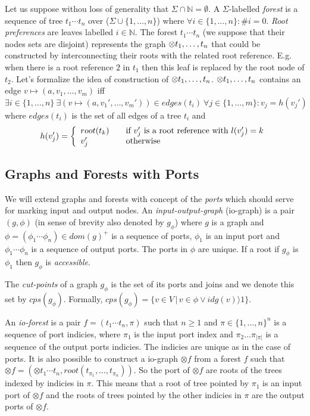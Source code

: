 Let us suppose withou loss of generality that $\Sigma \cap \mathbb{N} = \emptyset$.
A $\Sigma$-labelled \emph{forest} is a sequence of tree $t_1 \cdots t_n$ over ($\Sigma \cup \{1,\ldots,n\}$)
where $\forall i \in \{1,\ldots,n\}: \#i = 0$.
\emph{Root preferences} are leaves labelled $i \in \mathbb{N}$.
The forest $t_1 \cdots t_n$ (we suppose that their nodes sets are disjoint) represents the graph $\otimes t_1, \ldots, t_n$ that could
be constructed by interconnecting their roots with the related root reference.
E.g. when there is a root reference $2$ in $t_1$ then this leaf is replaced by the root node of $t_2$.
Let's formalize the idea of construction of $\otimes t_1, \ldots, t_n$.
$\otimes t_1, \ldots, t_n$ contains an edge $v \mapsto (a,v_1, \ldots,v_m)$ iff $\exists i \in \{1,\ldots,n\} \ \exists(v \mapsto (a, v_1', \ldots, v_m')) \in edges(t_i)
\ \forall j \in \{1,\ldots,m\}: v_j = h(v_j')$ where $edges(t_i)$ is the set of all edges of a tree $t_i$ and
\[ h(v_j') = \left\{
  \begin{array}{l l}
  root(t_k) & \quad \text{if $v_j'$ is a root reference with $l(v_j') = k$}\\
  v_j'   & \quad \text{otherwise}
  \end{array} \right.\]

\subsection{Graphs and Forests with Ports}
\label{subsec:gfp}

We will extend graphs and forests with concept of the \emph{ports} which should
serve for marking input and output nodes.
An \emph{input-output-graph} (io-graph) is a pair $(g,\phi)$ (in sense of brevity also denoted by $g_\phi$)
where $g$ is a graph and $\phi=(\phi_1 \cdots \phi_n) \in dom(g)^+$ is a sequence of ports, $\phi_1$
is an input port and $\phi_1 \cdots \phi_n$ is a sequence of output ports.
The ports in $\phi$ are unique.
If a root if $g_\phi$ is $\phi_1$ then $g_\phi$ is \emph{accessible}.

The \emph{cut-points} of a graph $g_\phi$ is the set of its ports and joins and we denote this set by $cps(g_\phi)$.
Formally, $cps(g_\phi)=\{v \in V\,|\, v \in \phi \vee idg(v) \rangle 1\}$.

An \emph{io-forest} is a pair $f=(t_1 \cdots t_n, \pi)$ such that $n \geq 1$ and $\pi \in \{1,\ldots,n\}^n$
is a sequence of port indicies, where $\pi_1$ is the input port index and $\pi_2 \ldots \pi_{|\pi|}$ is a sequence
of the output ports indicies.
The indicies are unique as in the case of ports.
It is also possible to construct a io-graph $\otimes f$ from a forest $f$ such that
$\otimes f = (\otimes t_1 \cdots t_n,root(t_{\pi_{1}},\ldots,t_{\pi_{n}}))$.
So the port of $\otimes f$ are roots of the trees indexed by indicies in $\pi$.
This means that a root of tree pointed by $\pi_1$ is an input port of $\otimes f$ and
the roots of trees pointed by the other indicies in $\pi$ are the output ports of $\otimes f$.


